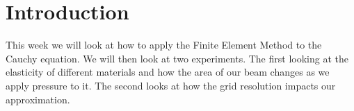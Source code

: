 \section{Introduction}
This week we will look at how to apply the Finite Element Method to the Cauchy equation. We will then look at two experiments. The first looking at the elasticity of different materials and how the area of our beam changes as we apply pressure to it. The second looks at how the grid resolution impacts our approximation.